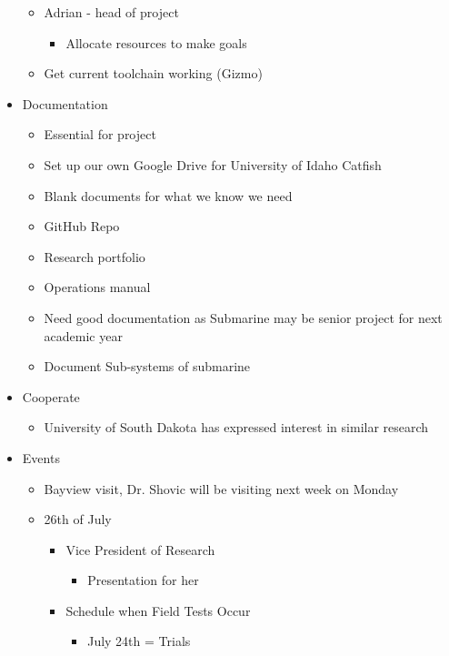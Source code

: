 \documentclass[12pt]{article}
\begin{document}
\begin{itemize}
\begin{itemize}
					\item Adrian - head of project
					\begin{itemize}
						\item Allocate resources to make goals
					\end{itemize}
					\item Get current toolchain working (Gizmo)
				\end{itemize}
				\item Documentation
				\begin{itemize}
					\item Essential for project
					\item Set up our own Google Drive for University of Idaho Catfish
					\item Blank documents for what we know we need
					\item GitHub Repo
					\item Research portfolio
					\item Operations manual
					\item Need good documentation as Submarine may be senior project for next academic year
					\item Document Sub-systems of submarine
				\end{itemize}
				\item Cooperate
				\begin{itemize}
					\item University of South Dakota has expressed interest in similar research
				\end{itemize}
				\item Events
				\begin{itemize}
					\item Bayview visit, Dr. Shovic will be visiting next week on Monday
					\item 26th of July
					\begin{itemize}
						\item Vice President of Research
						\begin{itemize}
							\item Presentation for her
						\end{itemize}
						\item Schedule when Field Tests Occur
						\begin{itemize}
							\item July 24th = Trials
						\end{itemize}
					\end{itemize}
				\end{itemize}

\end{itemize}
\end{document}

